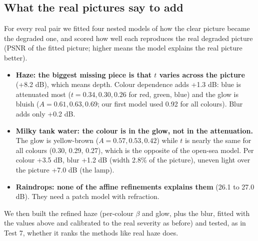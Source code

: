 \documentclass[10pt,a4paper]{article}
\newcommand{\tablein}[1]{}
\newcommand{\SYN}{\textcolor{orange!85!black}{\textbf{[SYNTHETIC]}}}
\newcommand{\REAL}{\textcolor{teal!80!black}{\textbf{[REAL]}}}
\begin{document}
\subsection{What the real pictures say to add}
For every real pair we fitted four nested models of how the clear picture became the degraded one, and scored how well each reproduces the real degraded picture (PSNR of the fitted picture; higher means the model explains the real picture better).
\begin{table}[H]\centering\scriptsize\resizebox{\textwidth}{!}{\tablein{model_refinement}}\caption{\REAL\ Fit of nested models to the real pairs. ``One $t$ and $A$'': $I=aJ+b$. ``Per colour'': a separate $a_c,b_c$ per channel. ``+ blur'': the scene is blurred first (best width per pair). ``+ local maps'': a separate map in each cell of a 4$\times$4 grid (96 parameters per pair, so part of this gain is flexibility). $t$ and $A$ are the means of the per-colour fit.}\end{table}
\begin{itemize}
\item \textbf{Haze: the biggest missing piece is that $t$ varies across the picture} (+8.2 dB), which means depth. Colour dependence adds +1.3 dB: blue is attenuated most ($t=0.34,0.30,0.26$ for red, green, blue) and the glow is bluish ($A=0.61,0.63,0.69$; our first model used 0.92 for all colours). Blur adds only +0.2 dB.
\item \textbf{Milky tank water: the colour is in the glow, not in the attenuation.} The glow is yellow-brown ($A=0.57,0.53,0.42$) while $t$ is nearly the same for all colours (0.30, 0.29, 0.27), which is the opposite of the open-sea model. Per colour +3.5 dB, blur +1.2 dB (width 2.8\% of the picture), uneven light over the picture +7.0 dB (the lamp).
\item \textbf{Raindrops: none of the affine refinements explains them} (26.1 to 27.0 dB). They need a patch model with refraction.
\end{itemize}
We then built the refined haze (per-colour $\beta$ and glow, plus the blur, fitted with the values above and calibrated to the real severity as before) and tested, as in Test 7, whether it ranks the methods like real haze does.
\begin{table}[H]\centering\scriptsize\tablein{outdoor_haze}\caption{\SYN\ Rank agreement of five synthetic hazes with the 185 real haze pairs (17 methods), and the winners.}\end{table}
\end{document}
